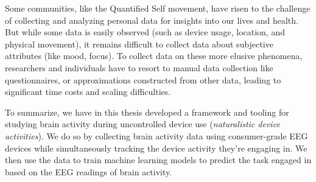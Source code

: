 




Some communities, like the Quantified Self movement, have risen to the challenge of collecting and analyzing personal data for insights into our lives and health. But while some data is easily observed (such as device usage, location, and physical movement), it remains difficult to collect data about subjective attributes (like mood, focus). To collect data on these more elusive phenomena, researchers and individuals have to resort to manual data collection like questionnaires, or approximations constructed from other data, leading to significant time costs and scaling difficulties.\cite{malhi_promise_2017}






To summarize, we have in this thesis developed a framework and tooling for studying brain activity during uncontrolled device use (\emph{naturalistic device activities}). We do so by collecting brain activity data using consumer-grade EEG devices while simultaneously tracking the device activity they're engaging in. We then use the data to train machine learning models to predict the task engaged in based on the EEG readings of brain activity.

